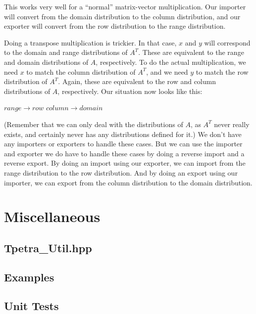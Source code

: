 \documentclass[10pt,relax]{TpetraDesign}
\begin{document}
This works very well for a ``normal'' matrix-vector multiplication. Our importer will convert from the domain distribution to the column distribution, and our exporter will convert from the row distribution to the range distribution. 

Doing a transpose multiplication is trickier. In that case, $x$ and $y$ will correspond to the domain and range distributions of $A^T$. These are equivalent to the range and domain distributions of $A$, respectively. To do the actual multiplication, we need $x$ to match the column distribution of $A^T$, and we need $y$ to match the row distribution of $A^T$. Again, these are equivalent to the row and column distributions of $A$, respectively. Our situation now looks like this:
\begin{center}
$range  \rightarrow row$
\hspace{1cm}
$column \rightarrow domain$
\end{center}

(Remember that we can only deal with the distributions of $A$, as $A^T$ never really exists, and certainly never has any distributions defined for it.) We don't have any importers or exporters to handle these cases. But we can use the importer and exporter we do have to handle these cases by doing a reverse import and a reverse export. By doing an import using our exporter, we can import from the range distribution to the row distribution. And by doing an export using our importer, we can export from the column distribution to the domain distribution.

%
\section{Miscellaneous}
\subsection{Tpetra\_Util.hpp}
\subsection{Examples}
\subsection{Unit Tests}

%
\clearpage


\end{document}
